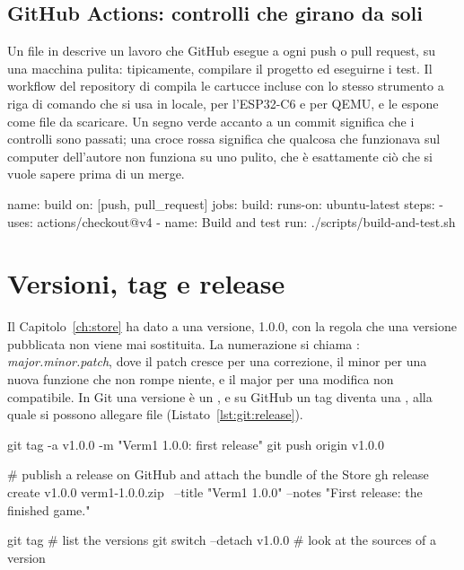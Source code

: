 \subsection{GitHub Actions: controlli che girano da soli}

Un file in  descrive un lavoro che GitHub esegue a
ogni push o pull request, su una macchina pulita: tipicamente, compilare il
progetto ed eseguirne i test. Il workflow del repository di \prg compila le
cartucce incluse con lo stesso strumento a riga di comando che si usa in
locale, per l'ESP32-C6 e per QEMU, e le espone come file da scaricare. Un
segno verde accanto a un commit significa che i controlli sono passati; una
croce rossa significa che qualcosa che funzionava sul computer dell'autore non
funziona su uno pulito, che è esattamente ciò che si vuole sapere prima di un
merge.

\begin{plain}[caption={Lo schema di un file di workflow (YAML). Il passo di compilazione
dipende dal progetto: per una cartuccia richiede la toolchain ESP-IDF.},label=lst:git:actions]
name: build
on: [push, pull_request]
jobs:
  build:
    runs-on: ubuntu-latest
    steps:
      - uses: actions/checkout@v4
      - name: Build and test
        run: ./scripts/build-and-test.sh
\end{plain}

\section{Versioni, tag e release}\label{sec:git:release}

Il Capitolo~\ref{ch:store} ha dato a \vermone una versione, 1.0.0, con la
regola che una versione pubblicata non viene mai sostituita. La numerazione si
chiama : \emph{major.minor.patch}, dove il patch
cresce per una correzione, il minor per una nuova funzione che non rompe
niente, e il major per una modifica non compatibile. In Git una versione è un
, e su GitHub un tag diventa una , alla quale si
possono allegare file (Listato~\ref{lst:git:release}).

\begin{shell}[caption={Etichettare la versione 1.0.0 e rilasciare il bundle.},label=lst:git:release]
git tag -a v1.0.0 -m "Verm1 1.0.0: first release"
git push origin v1.0.0

# publish a release on GitHub and attach the bundle of the Store
gh release create v1.0.0 verm1-1.0.0.zip \
    --title "Verm1 1.0.0" --notes "First release: the finished game."

git tag                 # list the versions
git switch --detach v1.0.0   # look at the sources of a version
\end{shell}

